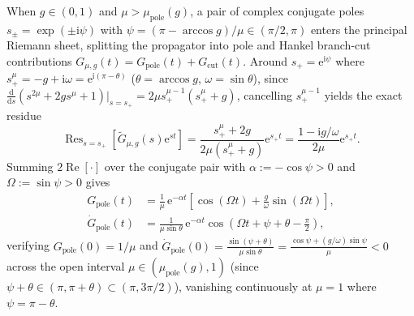 \documentclass[twocolumn,10pt,amsmath,amssymb,floatfix]{revtex4-2}
\theoremstyle{plain}
\theoremstyle{definition}
\newcommand{\dd}{\mathrm{d}}
\newcommand{\ii}{\mathrm{i}}
\newcommand{\ee}{\mathrm{e}}
\newcommand{\mupole}{\mu_{\mathrm{pole}}}
\begin{document}
When $g \in (0,1)$ and $\mu > \mupole(g)$, a pair of complex conjugate poles $s_\pm = \exp(\pm\ii\psi)$ with $\psi = (\pi - \arccos g)/\mu \in (\pi/2, \pi)$ enters the principal Riemann sheet, splitting the propagator into pole and Hankel branch-cut contributions $G_{\mu,g}(t) = G_{\mathrm{pole}}(t) + G_{\mathrm{cut}}(t)$. Around $s_+ = \ee^{\ii\psi}$ where $s_+^\mu = -g + \ii\omega = \ee^{\ii(\pi-\theta)}$ ($\theta = \arccos g$, $\omega = \sin\theta$), since $\frac{\dd}{\dd s}(s^{2\mu} + 2g s^\mu + 1)|_{s=s_+} = 2\mu s_+^{\mu-1}(s_+^\mu + g)$, cancelling $s_+^{\mu-1}$ yields the exact residue
\[
\operatorname{Res}_{s=s_+}\!\left[\tilde{G}_{\mu,g}(s)\ee^{st}\right]
= \frac{s_+^\mu + 2g}{2\mu(s_+^\mu + g)}\ee^{s_+ t} = \frac{1 - \ii g/\omega}{2\mu}\ee^{s_+ t}.
\]
Summing $2\operatorname{Re}[\cdot]$ over the conjugate pair with $\alpha := -\cos\psi > 0$ and $\Omega := \sin\psi > 0$ gives
\begin{align}
\label{eq:pole_cut_split}
G_{\mathrm{pole}}(t) &= \frac{1}{\mu}\,\ee^{-\alpha t}\!\left[\cos(\Omega t) + \frac{g}{\omega}\sin(\Omega t)\right], \nonumber\\
\dot{G}_{\mathrm{pole}}(t) &= \frac{1}{\mu\sin\theta}\,\ee^{-\alpha t}\cos\!\left(\Omega t + \psi + \theta - \frac{\pi}{2}\right),
\end{align}
verifying $G_{\mathrm{pole}}(0) = 1/\mu$ and $\dot{G}_{\mathrm{pole}}(0) = \frac{\sin(\psi + \theta)}{\mu\sin\theta} = \frac{\cos\psi + (g/\omega)\sin\psi}{\mu} < 0$ across the open interval $\mu \in (\mupole(g), 1)$ (since $\psi + \theta \in (\pi, \pi + \theta) \subset (\pi, 3\pi/2)$), vanishing continuously at $\mu = 1$ where $\psi = \pi - \theta$.
\end{document}
